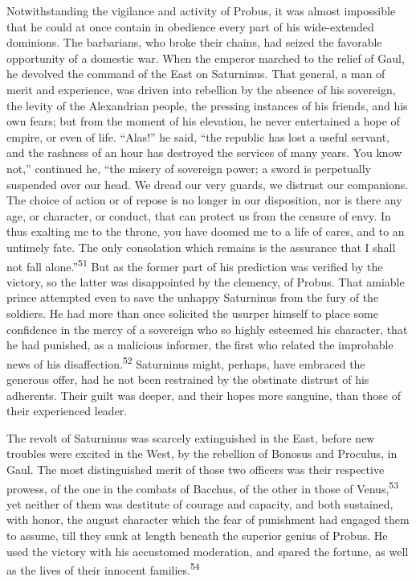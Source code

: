 Notwithstanding the vigilance and activity of Probus, it was
almost impossible that he could at once contain in obedience
every part of his wide-extended dominions. The barbarians, who
broke their chains, had seized the favorable opportunity of a
domestic war. When the emperor marched to the relief of Gaul, he
devolved the command of the East on Saturninus. That general, a
man of merit and experience, was driven into rebellion by the
absence of his sovereign, the levity of the Alexandrian people,
the pressing instances of his friends, and his own fears; but
from the moment of his elevation, he never entertained a hope of
empire, or even of life. “Alas!” he said, “the republic has lost
a useful servant, and the rashness of an hour has destroyed the
services of many years. You know not,” continued he, “the misery
of sovereign power; a sword is perpetually suspended over our
head. We dread our very guards, we distrust our companions. The
choice of action or of repose is no longer in our disposition,
nor is there any age, or character, or conduct, that can protect
us from the censure of envy. In thus exalting me to the throne,
you have doomed me to a life of cares, and to an untimely fate.
The only consolation which remains is the assurance that I shall
not fall alone.”\textsuperscript{51} But as the former part of his prediction was
verified by the victory, so the latter was disappointed by the
clemency, of Probus. That amiable prince attempted even to save
the unhappy Saturninus from the fury of the soldiers. He had more
than once solicited the usurper himself to place some confidence
in the mercy of a sovereign who so highly esteemed his character,
that he had punished, as a malicious informer, the first who
related the improbable news of his disaffection.\textsuperscript{52} Saturninus
might, perhaps, have embraced the generous offer, had he not been
restrained by the obstinate distrust of his adherents. Their
guilt was deeper, and their hopes more sanguine, than those of
their experienced leader.



The revolt of Saturninus was scarcely extinguished in the East,
before new troubles were excited in the West, by the rebellion of
Bonosus and Proculus, in Gaul. The most distinguished merit of
those two officers was their respective prowess, of the one in
the combats of Bacchus, of the other in those of Venus,\textsuperscript{53} yet
neither of them was destitute of courage and capacity, and both
sustained, with honor, the august character which the fear of
punishment had engaged them to assume, till they sunk at length
beneath the superior genius of Probus. He used the victory with
his accustomed moderation, and spared the fortune, as well as the
lives of their innocent families.\textsuperscript{54}

